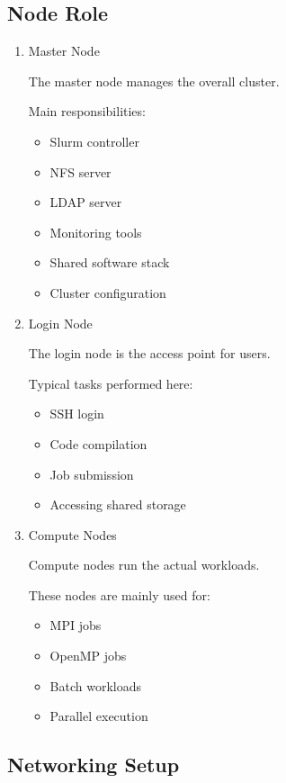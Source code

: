 \documentclass[11pt]{article}
\begin{document}
\subsection{Node Role}
\label{sec:org472683a}
\begin{enumerate}
\item Master Node
\label{sec:org62c4106}

The master node manages the overall cluster.

Main responsibilities:

\begin{itemize}
\item Slurm controller
\item NFS server
\item LDAP server
\item Monitoring tools
\item Shared software stack
\item Cluster configuration
\end{itemize}
\item Login Node
\label{sec:org857a364}

The login node is the access point for users.

Typical tasks performed here:

\begin{itemize}
\item SSH login
\item Code compilation
\item Job submission
\item Accessing shared storage
\end{itemize}
\item Compute Nodes
\label{sec:org61f0781}

Compute nodes run the actual workloads.

These nodes are mainly used for:

\begin{itemize}
\item MPI jobs
\item OpenMP jobs
\item Batch workloads
\item Parallel execution
\end{itemize}
\end{enumerate}
\subsection{Networking Setup}
\label{sec:org6cf0739}
\end{document}
